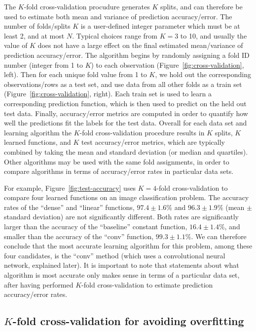 \documentclass[12pt]{article}
\begin{document}
The $K$-fold cross-validation procudure generates $K$ splits, and can
therefore be used to estimate both mean and variance of prediction
accuracy/error. The number of folds/splits $K$ is a user-defined
integer parameter which must be at least 2, and at most $N$. Typical
choices range from $K=3$ to 10, and usually the value of $K$ does not
have a large effect on the final estimated mean/variance of prediction
accuracy/error. The algorithm begins by randomly assigning a fold ID
number (integer from 1 to $K$) to each observation
(Figure~\ref{fig:cross-validation}, left). Then for each unique fold
value from 1 to $K$, we hold out the corresponding observations/rows
as a test set, and use data from all other folds as a train set
(Figure~\ref{fig:cross-validation}, right). Each train set is used to
learn a corresponding prediction function, which is then used to
predict on the held out test data. Finally, accuracy/error metrics are
computed in order to quantify how well the predictions fit the labels
for the test data. Overall for each data set and learning algorithm
the $K$-fold cross-validation procedure results in $K$ splits, $K$
learned functions, and $K$ test accuracy/error metrics, which are
typically combined by taking the mean and standard deviation (or
median and quartiles). Other algorithms may be used with the same fold
assignments, in order to compare algorithms in terms of accuracy/error
rates in particular data sets.

For example, Figure~\ref{fig:test-accuracy} uses $K=4$-fold
cross-validation to compare four learned functions on an image
classification problem. The accuracy rates of the ``dense'' and
``linear'' functions, $97.4 \pm 1.6 \%$ and $96.3 \pm 1.9 \%$ (mean
$\pm$ standard deviation) are not significantly different. Both rates
are significantly larger than the accuracy of the ``baseline''
constant function, $16.4 \pm 1.4 \%$, and smaller than the accuracy of
the ``conv'' function, $99.3 \pm 1.1 \%$. We can therefore conclude
that the most accurate learning algorithm for this problem, among
these four candidates, is the ``conv'' method (which uses a
convolutional neural network, explained later).  It is important to
note that statements about what algorithm is most accurate only makes
sense in terms of a particular data set, after having performed
$K$-fold cross-validation to estimate prediction accuracy/error rates.

\subsection{$K$-fold cross-validation for avoiding overfitting}
\end{document}
